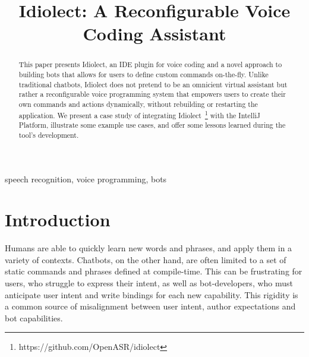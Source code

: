\documentclass[conference]{IEEEtran}
\begin{document}
\title{Idiolect: A Reconfigurable Voice Coding Assistant}

\author{
\and
{}
\and
{}
}

\maketitle

\begin{abstract}
This paper presents Idiolect, an IDE plugin for voice coding and a novel approach to building bots that allows for users to define custom commands on-the-fly. Unlike traditional chatbots, Idiolect does not pretend to be an omnicient virtual assistant but rather a reconfigurable voice programming system that empowers users to create their own commands and actions dynamically, without rebuilding or restarting the application. We present a case study of integrating Idiolect~\footnote{https://github.com/OpenASR/idiolect} with the IntelliJ Platform, illustrate some example use cases, and offer some lessons learned during the tool's development.
\end{abstract}

\begin{IEEEkeywords}
    speech recognition, voice programming, bots
\end{IEEEkeywords}

\section{Introduction}


Humans are able to quickly learn new words and phrases, and apply them in a variety of contexts. Chatbots, on the other hand, are often limited to a set of static commands and phrases defined at compile-time. This can be frustrating for users, who struggle to express their intent, as well as bot-developers, who must anticipate user intent and write bindings for each new capability. This rigidity is a common source of misalignment between user intent, author expectations and bot capabilities.
\end{document}
